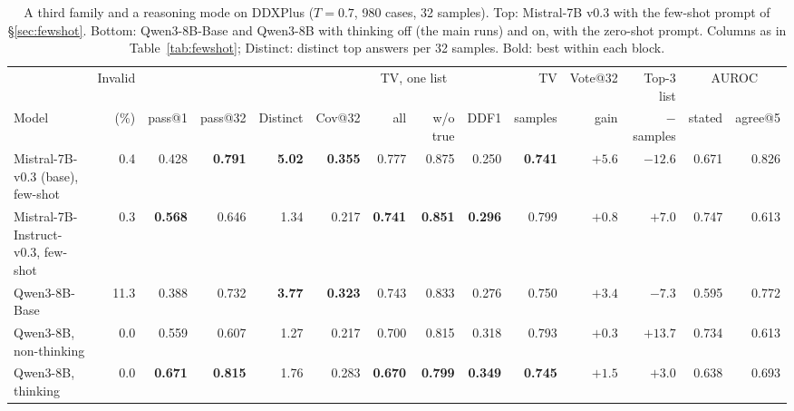 \documentclass[11pt]{article}
\begin{document}
\begin{table}[t]
\centering
\begin{adjustbox}{max width=\textwidth}
\begin{tabular}{lrrrrrrrrrrrrr}
\toprule
 & Invalid & & & & & \multicolumn{2}{c}{TV, one list} & & TV & Vote@32 & Top-3 list & \multicolumn{2}{c}{AUROC} \\
Model & (\%) & pass@1 & pass@32 & Distinct & Cov@32 & all & w/o true & DDF1 & samples & gain & $-$ samples & stated & agree@5 \\
\midrule
Mistral-7B-v0.3 (base), few-shot & 0.4 & 0.428 & \textbf{0.791} & \textbf{5.02} & \textbf{0.355} & 0.777 & 0.875 & 0.250 & \textbf{0.741} & $+5.6$ & $-12.6$ & 0.671 & 0.826 \\
Mistral-7B-Instruct-v0.3, few-shot & 0.3 & \textbf{0.568} & 0.646 & 1.34 & 0.217 & \textbf{0.741} & \textbf{0.851} & \textbf{0.296} & 0.799 & $+0.8$ & $+7.0$ & 0.747 & 0.613 \\
\midrule
Qwen3-8B-Base & 11.3 & 0.388 & 0.732 & \textbf{3.77} & \textbf{0.323} & 0.743 & 0.833 & 0.276 & 0.750 & $+3.4$ & $-7.3$ & 0.595 & 0.772 \\
Qwen3-8B, non-thinking & 0.0 & 0.559 & 0.607 & 1.27 & 0.217 & 0.700 & 0.815 & 0.318 & 0.793 & $+0.3$ & $+13.7$ & 0.734 & 0.613 \\
Qwen3-8B, thinking & 0.0 & \textbf{0.671} & \textbf{0.815} & 1.76 & 0.283 & \textbf{0.670} & \textbf{0.799} & \textbf{0.349} & \textbf{0.745} & $+1.5$ & $+3.0$ & 0.638 & 0.693 \\
\bottomrule
\end{tabular}
\end{adjustbox}
\caption{A third family and a reasoning mode on DDXPlus ($T{=}0.7$, 980 cases, 32 samples). Top: Mistral-7B v0.3 with the few-shot prompt of \S\ref{sec:fewshot}. Bottom: Qwen3-8B-Base and Qwen3-8B with thinking off (the main runs) and on, with the zero-shot prompt. Columns as in Table~\ref{tab:fewshot}; Distinct: distinct top answers per 32 samples. Bold: best within each block.}
\label{tab:third}
\end{table}
\end{document}
